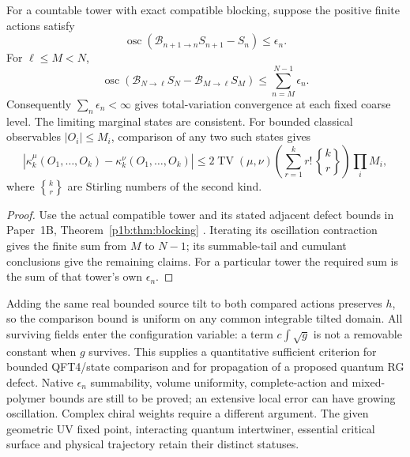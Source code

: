\documentclass[12pt,a4paper]{article}
\begin{document}
\begin{corollary}
\label{p12:cor:v203-summable-action-defects}
For a countable tower with exact compatible blocking, suppose the positive
finite actions satisfy
\[
 \operatorname{osc}(\mathcal B_{n+1\to n}S_{n+1}-S_n)\le\epsilon_n.
\]
For $\ell\le M<N$,
\[
 \operatorname{osc}(\mathcal B_{N\to\ell}S_N
                   -\mathcal B_{M\to\ell}S_M)
 \le\sum_{n=M}^{N-1}\epsilon_n.
\]
Consequently $\sum_n\epsilon_n<\infty$ gives total-variation convergence
at each fixed coarse level. The limiting marginal states are consistent.
For bounded classical observables $|O_i|\le M_i$, comparison of any two
such states gives
\[
 |\kappa_k^\mu(O_1,\ldots,O_k)-\kappa_k^\nu(O_1,\ldots,O_k)|
 \le2\operatorname{TV}(\mu,\nu)
       \left(\sum_{r=1}^k r!\,{k\brace r}\right)\prod_i M_i,
\]
where ${k\brace r}$ are Stirling numbers of the second kind.
\end{corollary}
\begin{proof}
Use the actual compatible tower and its stated adjacent defect bounds
in Paper~1B, Theorem~\ref{p1b:thm:blocking}
\cite{Kugelmann2026Paper1B}. Iterating its oscillation contraction
gives the finite sum from $M$ to $N-1$; its summable-tail and cumulant
conclusions give the remaining claims. For a particular tower the
required sum is the sum of that tower's own $\epsilon_n$.
\end{proof}
Adding the same real bounded source tilt to both compared actions preserves
$h$, so the comparison bound is uniform on any common integrable tilted
domain. All surviving fields enter the configuration variable: a term
$c\int\sqrt g$ is not a removable constant when $g$ survives.
This supplies a quantitative sufficient criterion for bounded QFT4/state
comparison and for propagation of a proposed quantum RG defect. Native
$\epsilon_n$ summability, volume uniformity, complete-action and mixed-polymer
bounds are still to be proved; an extensive local error can have growing
oscillation. Complex chiral weights require a different argument. The given
geometric UV fixed point, interacting quantum intertwiner, essential
critical surface and physical trajectory retain their distinct statuses.
\end{document}
